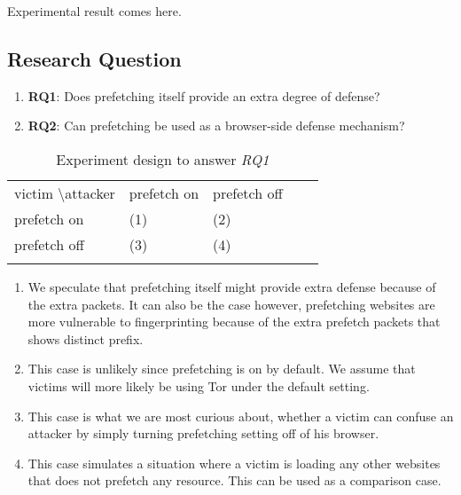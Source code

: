 Experimental result comes here.

\subsection{Research Question}

\begin{enumerate}
\item
{\bf RQ1}: Does prefetching itself provide an extra degree of defense?
\item
{\bf RQ2}: Can prefetching be used as a browser-side defense mechanism?
\end{enumerate}


\begin{table}[]
\centering
\caption{Experiment design to answer {\it RQ1}}
\label{table:prefetch}
\begin{tabular}{lllll}
\cline{1-3}
\multicolumn{1}{|l|}{victim \textbackslash attacker} & \multicolumn{1}{l|}{prefetch on} & \multicolumn{1}{l|}{prefetch off} &  &  \\ \cline{1-3}
\multicolumn{1}{|l|}{prefetch on}                    & \multicolumn{1}{l|}{(1)}         & \multicolumn{1}{l|}{(2)}          &  &  \\ \cline{1-3}
\multicolumn{1}{|l|}{prefetch off}                   & \multicolumn{1}{l|}{(3)}         & \multicolumn{1}{l|}{(4)}          &  &  \\ \cline{1-3}
                                                     &                                  &                                   &  & 
\end{tabular}                  
\end{table}

\begin{enumerate}
\item
We speculate that prefetching itself might provide extra defense because of the extra packets.
It can also be the case however, prefetching websites are more vulnerable to fingerprinting because of the extra prefetch packets that shows distinct prefix.
\item
This case is unlikely since prefetching is on by default. We assume that victims will more likely be using Tor under the default setting.
\item
This case is what we are most curious about, whether a victim can confuse an attacker by simply turning prefetching setting off of his browser.
\item
This case simulates a situation where a victim is loading any other websites that does not prefetch any resource.
This can be used as a comparison case.
\end{enumerate}

